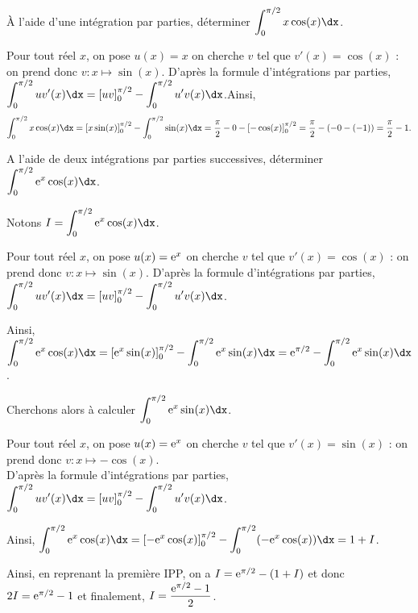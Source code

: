 \documentclass[11pt,fleqn, openany]{book} %
\begin{document}
\begin{exercise}À l'aide d'une intégration par parties, déterminer $\displaystyle \int _{0}^{\pi /2} x\cos (x) \dx$.\end{exercise}

\begin{solution}Pour tout réel $x$, on pose $u(x)=x$ on cherche $v$ tel que $v'(x)=\cos(x)$ : on prend donc $v:x\mapsto \sin(x)$. D'après la formule d'intégrations par parties, $\displaystyle \int _{0}^{\pi /2} uv' (x) \dx = [uv]_0^{\pi/2}-\displaystyle \int _{0}^{\pi /2} u'v(x) \dx$.Ainsi, 
\[\displaystyle \int _{0}^{\pi /2} x\cos (x) \dx = [x\sin(x)]_0^{\pi/2}-\displaystyle \int _{0}^{\pi /2}\sin(x)\dx=\dfrac{\pi}{2}-0-[-\cos(x)]_0^{\pi/2}=\dfrac{\pi}{2}-(-0-(-1))=\dfrac{\pi}{2}-1.\]
\end{solution}



\begin{exercise}A l'aide de deux intégrations par parties successives, déterminer $\displaystyle \int _{0}^{\pi /2} \e^x\cos (x) \dx$.\newpage \end{exercise}

\begin{solution}Notons $I=\displaystyle \int _{0}^{\pi /2} \e^x\cos (x) \dx$.

Pour tout réel $x$, on pose $u(x)=\mathrm{e}^x$ on cherche $v$ tel que $v'(x)=\cos(x)$ : on prend donc $v:x\mapsto \sin(x)$. D'après la formule d'intégrations par parties, $\displaystyle \int _{0}^{\pi /2} uv' (x) \dx = [uv]_0^{\pi/2}-\displaystyle \int _{0}^{\pi /2} u'v(x) \dx$.

Ainsi, $\displaystyle \int _{0}^{\pi /2} \e^x\cos (x) \dx = [\e^x\sin(x)]_0^{\pi/2}-\displaystyle \int _{0}^{\pi /2}\e^x\sin(x)\dx=\e^{\pi/2}-\displaystyle \int _{0}^{\pi /2}\e^x\sin(x)\dx$.

Cherchons alors à calculer $\displaystyle \int _{0}^{\pi /2}\e^x\sin(x)\dx$. 

Pour tout réel $x$, on pose $u(x)=\mathrm{e}^x$ on cherche $v$ tel que $v'(x)=\sin(x)$ : on prend donc $v:x\mapsto -\cos(x)$. \\ D'après la formule d'intégrations par parties, $\displaystyle \int _{0}^{\pi /2} uv' (x) \dx = [uv]_0^{\pi/2}-\displaystyle \int _{0}^{\pi /2} u'v(x) \dx$.

Ainsi, $\displaystyle \int _{0}^{\pi /2} \e^x\cos (x) \dx = [-\e^x\cos(x)]_0^{\pi/2}-\displaystyle \int _{0}^{\pi /2}(-\e^x\cos(x))\dx=1+I$.

Ainsi, en reprenant la première IPP, on a $I=\mathrm{e}^{\pi/2}-(1+I)$ et donc $2I=\mathrm{e}^{\pi/2}-1$ et finalement, $I=\dfrac{\mathrm{e}^{\pi/2}-1}{2}$.\end{solution}
\end{document}
